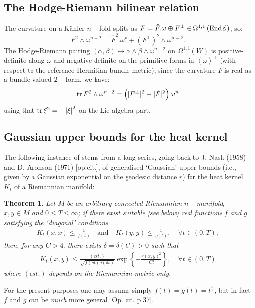 \documentclass{article}
\newcommand{\func}[1]{\textnormal {#1\,}}
\newtheorem{theorem}{Theorem}
\begin{document}
\subsection{The Hodge-Riemann bilinear relation}
 
The curvature on a K\"{a}hler $n-$fold splits as $F=\hat{F}.\omega \oplus
F^{\perp }\in \Omega ^{1,1}\left( \func{End}\mathcal{E}\right) $, so: 
\begin{equation*}
F^{2}\wedge \omega ^{n-2}=\hat{F}^{2}.\omega ^{n}+( F^{\perp })
^{2}\wedge \omega ^{n-2}.
\end{equation*}%
The Hodge-Riemann pairing $\left( \alpha ,\beta \right) \longmapsto \alpha
\wedge \beta \wedge \omega^{n-2} $ on $\Omega ^{1,1}\left( W\right) $ is
positive-definite along $\omega $ and negative-definite on the primitive
forms in $\left\langle \omega \right\rangle ^{\perp }$ \cite[pp.39-40]%
{Huybrechts} (with respect to the reference Hermitian bundle metric); since
the curvature $F$ is real as a bundle-valued $2-$form, we have:%
\begin{equation}        \label{Eq Hodge-Riemann}
        \func{tr}F^{2}\wedge \omega ^{n-2}
        =\left( \vert F^{\perp}\vert ^{2}
        -\vert \hat{F}\vert ^{2}\right) \omega ^{n}
\end{equation}%
using that $\func{tr}\xi ^{2}=-\left\vert \xi \right\vert ^{2}$ on the
Lie algebra part.

\newpage
\subsection{Gaussian upper bounds for the heat kernel} 
\label{App Gaussian upper bound}
The following instance of \cite[Theorem 1.1]{Heat kernel bounds} stems from a long series, going back to J. Nash (1958) and D. Aronson (1971) [op.cit.], of generalised `Gaussian' upper bounds (i.e., given by a Gaussian exponential on the geodesic distance $r$) for the heat kernel $K_t$ of a Riemannian manifold: %
\begin{theorem} \label{Thm Gaussian bound on heat kernel}
        Let $M$ be an arbitrary connected Riemannian $n-$manifold, $x,y\in M$         and $0\leq T\leq\infty$; if there exist suitable [see below] real         functions $f$ and $g$ satisfying the `diagonal' conditions 
        \begin{eqnarray*}
                K_t(x,x)\leq\frac{1}{f(t)}\quad \text{and} \quad K_t(y,y)\leq\frac{1}{g(t)},\quad         \forall t\in \left(0,T\right),
        \end{eqnarray*}
        then, for any $C>4$, there exists $\delta=\delta(C)>0$ such that
        \begin{eqnarray*}
                \boxed{ K_t(x,y) \leq \frac{(cst.)}{\sqrt{f(\delta t)g(\delta t)}}\exp\left\{-\frac{r(x,y)^2}{Ct}\right\},                 \quad \forall t\in \left(0,T\right)}
        \end{eqnarray*}
        where $(cst.)$ depends on the Riemannian metric only. 
\end{theorem}
For the present purposes one may assume simply $f(t)=g(t)=t^{\tfrac{n}{2}}$, but in fact $f$ and $g$ can be \emph{much} more general [Op. cit. p.37].
\end{document}
